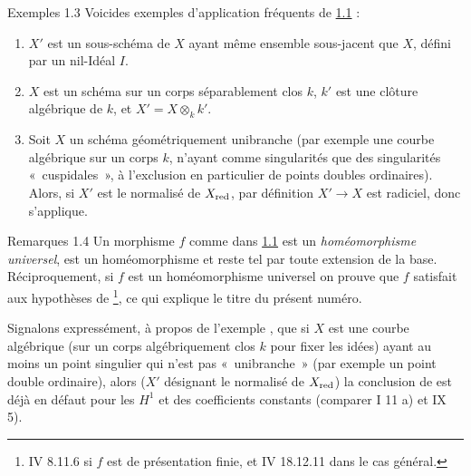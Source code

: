 \documentclass[10pt]{../fichiers-configuration-latex/smfart}
\begin{document}
\begin{enonce*}[remark]{Exemples 1.3}
Voici\pageoriginale  des exemples d'application fréquents de \hyperref[VIII.thm1.1]{1.1} :
\begin{enumerate}
\renewcommand{\theenumi}{\alph{enumi}}
\renewcommand{\labelenumi}{\theenumi)}
\item $X'$ est un sous-schéma de $X$ ayant même ensemble sous-jacent
  que $X$, \ie défini par un nil-Idéal $I$.

\item $X$ est un schéma sur un corps séparablement clos $k$, $k'$ est
  une clôture algébrique de $k$, et $X'= X \otimes_k k'$.

\item Soit $X$ un schéma géométriquement unibranche (par exemple une
  courbe algébrique sur un corps $k$, n'ayant comme singularités que
  des singularités « cuspidales », à l'exclusion en particulier de
  points doubles ordinaires). Alors, si $X'$ est le normalisé de
  $X_{\operatorname{red}}$, par définition $X'\to X$ est radiciel, donc
   s'applique.
\end{enumerate}
\end{enonce*}

\begin{enonce*}[remark]{Remarques 1.4}
Un morphisme $f$ comme dans \hyperref[VIII.thm1.1]{1.1} est un \emph{homéomorphisme
  universel}, \ie est un homéomorphisme et reste tel par toute
  extension de la base. Réciproquement, si $f$ est un homéomorphisme
  universel on prouve que $f$ satisfait aux hypothèses de 
  \footnote{\Cf \EGA IV 8.11.6 si $f$ est de présentation finie, et \EGA
  IV 18.12.11 dans le cas général.}, ce qui explique le titre du
  présent numéro.

Signalons expressément, à propos de l'exemple ,
que si $X$ est
une courbe algébrique (sur un corps algébriquement clos $k$ pour fixer
les idées) ayant au moins un point singulier qui n'est pas « unibranche » (par exemple un point double ordinaire), alors ($X'$
désignant le normalisé de $X_{\operatorname{red}}$) la conclusion de 
est déjà en
défaut pour les $H^1$ et des coefficients constants (comparer  I
11 a) et  IX 5).
\end{enonce*}
\end{document}
